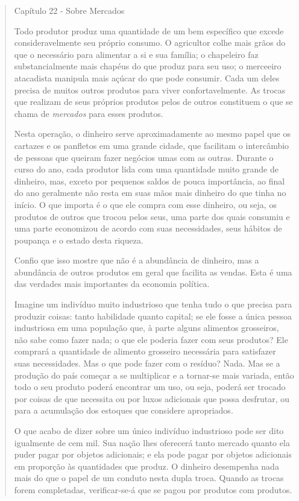 \documentclass[12pt]{article}
\begin{document}
\begin{quote}
Capítulo 22 - Sobre Mercados

Todo produtor produz uma quantidade de um bem específico que excede consideravelmente seu próprio consumo. O agricultor colhe mais grãos do que o necessário para alimentar a si e sua família; o chapeleiro faz substancialmente mais chapéus do que produz para seu uso; o merceeiro atacadista manipula mais açúcar do que pode consumir. Cada um deles precisa de muitos outros produtos para viver confortavelmente. As trocas que realizam de seus próprios produtos pelos de outros constituem o que se chama de \textit{mercados} para esses produtos.

Nesta operação, o dinheiro serve aproximadamente ao mesmo papel que os cartazes e os panfletos em uma grande cidade, que facilitam o intercâmbio de pessoas que queiram fazer negócios umas com as outras. Durante o curso do ano, cada produtor lida com uma quantidade muito grande de dinheiro, mas, exceto por pequenos saldos de pouca importância, ao final do ano geralmente não resta em suas mãos mais dinheiro do que tinha no início. O que importa é o que ele compra com esse dinheiro, ou seja, os produtos de outros que trocou pelos seus, uma parte dos quais consumiu e uma parte economizou de acordo com suas necessidades, seus hábitos de poupança e o estado desta riqueza.

Confio que isso mostre que não é a abundância de dinheiro, mas a abundância de outros produtos em geral que facilita as vendas. Esta é uma das verdades mais importantes da economia política.

Imagine um indivíduo muito industrioso que tenha tudo o que precisa para produzir coisas: tanto habilidade quanto capital; se ele fosse a única pessoa industriosa em uma população que, à parte alguns alimentos grosseiros, não sabe como fazer nada; o que ele poderia fazer com seus produtos? Ele comprará a quantidade de alimento grosseiro necessária para satisfazer suas necessidades. Mas o que pode fazer com o resíduo? Nada. Mas se a produção do país começar a se multiplicar e a tornar-se mais variada, então todo o seu produto poderá encontrar um uso, ou seja, poderá ser trocado por coisas de que necessita ou por luxos adicionais que possa desfrutar, ou para a acumulação dos estoques que considere apropriados.

O que acabo de dizer sobre um único indivíduo industrioso pode ser dito igualmente de cem mil. Sua nação lhes oferecerá tanto mercado quanto ela puder pagar por objetos adicionais; e ela pode pagar por objetos adicionais em proporção às quantidades que produz. O dinheiro desempenha nada mais do que o papel de um conduto nesta dupla troca. Quando as trocas forem completadas, verificar-se-á que se pagou por produtos com produtos.


\end{quote}
\end{document}
